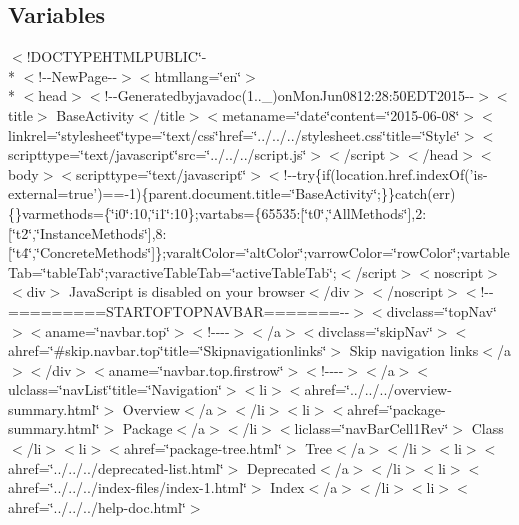 \subsection*{Variables}
\begin{DoxyCompactItemize}
\item 
$<$!D\-O\-C\-T\-Y\-P\-E\-H\-T\-M\-L\-P\-U\-B\-L\-I\-C\char`\"{}-\/\\*
$<$!-\/-\/New\-Page-\/-\/$>$$<$htmllang=\char`\"{}en\char`\"{}$>$\\*
$<$head$>$$<$!-\/-\/Generatedbyjavadoc(1..\-\_)on\-Mon\-Jun0812\-:28\-:50\-E\-D\-T2015-\/-\/$>$$<$title$>$ Base\-Activity$<$/title$>$$<$metaname=\char`\"{}date\char`\"{}content=\char`\"{}2015-\/06-\/08\char`\"{}$>$$<$linkrel=\char`\"{}stylesheet\char`\"{}type=\char`\"{}text/css\char`\"{}href=\char`\"{}../../../stylesheet.\-css\char`\"{}title=\char`\"{}\-Style\char`\"{}$>$$<$scripttype=\char`\"{}text/javascript\char`\"{}src=\char`\"{}../../../script.\-js\char`\"{}$>$$<$/script$>$$<$/head$>$$<$body$>$$<$scripttype=\char`\"{}text/javascript\char`\"{}$>$$<$!-\/-\/try\{if(location.\-href.\-index\-Of('is-\/external=true')==-\/1)\{parent.\-document.\-title=\char`\"{}\-Base\-Activity\char`\"{};\}\}catch(err)\{\}varmethods=\{\char`\"{}i0\char`\"{}\-:10,\char`\"{}i1\char`\"{}\-:10\};vartabs=\{65535\-:\mbox{[}\char`\"{}t0\char`\"{},\char`\"{}\-All\-Methods\char`\"{}\mbox{]},2\-:\mbox{[}\char`\"{}t2\char`\"{},\char`\"{}\-Instance\-Methods\char`\"{}\mbox{]},8\-:\mbox{[}\char`\"{}t4\char`\"{},\char`\"{}\-Concrete\-Methods\char`\"{}\mbox{]}\};varalt\-Color=\char`\"{}alt\-Color\char`\"{};varrow\-Color=\char`\"{}row\-Color\char`\"{};vartable\-Tab=\char`\"{}table\-Tab\char`\"{};varactive\-Table\-Tab=\char`\"{}active\-Table\-Tab\char`\"{};$<$/script$>$$<$noscript$>$$<$div$>$ Java\-Script is disabled on your browser$<$/div$>$$<$/noscript$>$$<$!-\/-\/=========\-S\-T\-A\-R\-T\-O\-F\-T\-O\-P\-N\-A\-V\-B\-A\-R=======-\/-\/$>$$<$divclass=\char`\"{}top\-Nav\char`\"{}$>$$<$aname=\char`\"{}navbar.\-top\char`\"{}$>$$<$!-\/-\/-\/-\/$>$$<$/a$>$$<$divclass=\char`\"{}skip\-Nav\char`\"{}$>$$<$ahref=\char`\"{}\#skip.\-navbar.\-top\char`\"{}title=\char`\"{}\-Skipnavigationlinks\char`\"{}$>$ Skip navigation links$<$/a$>$$<$/div$>$$<$aname=\char`\"{}navbar.\-top.\-firstrow\char`\"{}$>$$<$!-\/-\/-\/-\/$>$$<$/a$>$$<$ulclass=\char`\"{}nav\-List\char`\"{}title=\char`\"{}\-Navigation\char`\"{}$>$$<$li$>$$<$ahref=\char`\"{}../../../overview-\/summary.\-html\char`\"{}$>$ Overview$<$/a$>$$<$/li$>$$<$li$>$$<$ahref=\char`\"{}package-\/summary.\-html\char`\"{}$>$ Package$<$/a$>$$<$/li$>$$<$liclass=\char`\"{}nav\-Bar\-Cell1\-Rev\char`\"{}$>$ Class$<$/li$>$$<$li$>$$<$ahref=\char`\"{}package-\/tree.\-html\char`\"{}$>$ Tree$<$/a$>$$<$/li$>$$<$li$>$$<$ahref=\char`\"{}../../../deprecated-\/list.\-html\char`\"{}$>$ Deprecated$<$/a$>$$<$/li$>$$<$li$>$$<$ahref=\char`\"{}../../../index-\/files/index-\/1.\-html\char`\"{}$>$ Index$<$/a$>$$<$/li$>$$<$li$>$$<$ahref=\char`\"{}../../../help-\/doc.\-html\char`\"{}$>$ $$
\end{DoxyCompactItemize}

